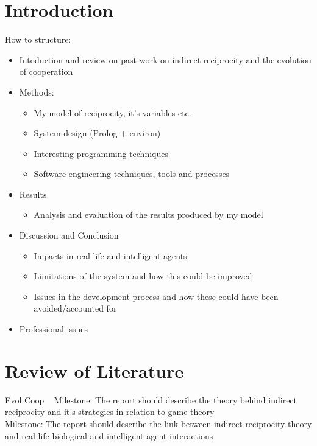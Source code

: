 \chapter{Introduction}
How to structure:\\
\begin{itemize}
	\item Intoduction and review on past work on indirect reciprocity and the evolution of cooperation
	\item Methods: 
	\begin{itemize}
		\item My model of reciprocity, it's variables etc.
		\item System design (Prolog + environ)
		\item Interesting programming techniques
		\item Software engineering techniques, tools and processes
	\end{itemize}
	\item Results
	\begin{itemize}
		\item Analysis and evaluation of the results produced by my model
	\end{itemize}
	\item Discussion and Conclusion
	\begin{itemize}
		\item Impacts in real life and intelligent agents
		\item Limitations of the system and how this could be improved
		\item Issues in the development process and how these could have been avoided/accounted for
	\end{itemize}
	\item Professional issues
\end{itemize}

\chapter{Review of Literature}
Evol Coop ~\cite{evolution_of_cooperation}
Milestone: The report should describe the theory behind indirect reciprocity and it’s strategies in relation to game-theory\\
Milestone: The report should describe the link between indirect reciprocity theory and real life biological and intelligent agent interactions\\


